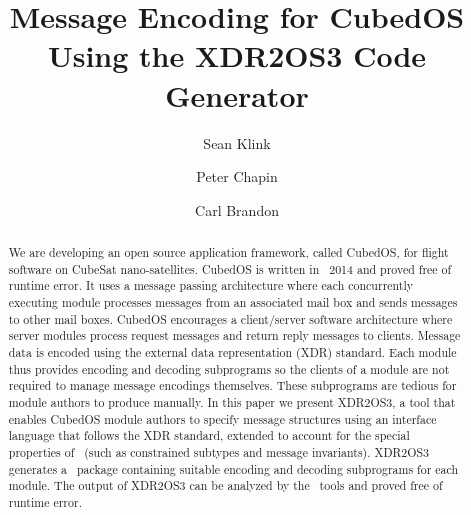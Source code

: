 \documentclass{llncs}
\begin{document}
\title{Message Encoding for CubedOS Using the XDR2OS3 Code Generator}
\author{Sean Klink \and Peter Chapin \and Carl Brandon }


\maketitle

\begin{abstract}

  We are developing an open source application framework, called CubedOS, for flight software on
  CubeSat nano-satellites. CubedOS is written in \SPARK\ 2014 and proved free of runtime error.
  It uses a message passing architecture where each concurrently executing module processes
  messages from an associated mail box and sends messages to other mail boxes. CubedOS
  encourages a client/server software architecture where server modules process request messages
  and return reply messages to clients. Message data is encoded using the external data
  representation (XDR) standard. Each module thus provides encoding and decoding subprograms so
  the clients of a module are not required to manage message encodings themselves. These
  subprograms are tedious for module authors to produce manually. In this paper we present
  XDR2OS3, a tool that enables CubedOS module authors to specify message structures using an
  interface language that follows the XDR standard, extended to account for the special
  properties of \SPARK\ (such as constrained subtypes and message invariants). XDR2OS3 generates
  a \SPARK\ package containing suitable encoding and decoding subprograms for each module. The
  output of XDR2OS3 can be analyzed by the \SPARK\ tools and proved free of runtime error.

\end{abstract}






\end{document}
